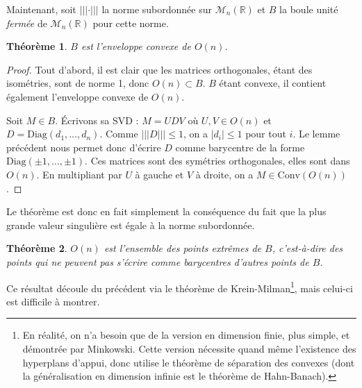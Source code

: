 \documentclass[a4paper, 11pt]{article}
\def\R{\mathbb{R}}
\def\M{\mathcal{M}}
\def\Diag{\mathrm{Diag}}
\newtheorem*{theorem}{Théorème}
\begin{document}
Maintenant, soit $||| \cdot |||$ la norme subordonnée sur $\M_n(\R)$ et $B$ la
boule unité \emph{fermée} de $\M_n(\R)$ pour cette norme.

\begin{theorem}
  $B$ est l'enveloppe convexe de $O(n)$. 
\end{theorem}

\begin{proof}
  Tout d'abord, il est clair que les matrices orthogonales, étant des
  isométries, sont de norme 1, donc $O(n) \subset B$. $B$ étant convexe, il
  contient également l'enveloppe convexe de $O(n)$.

  Soit $M \in B$. Écrivons sa SVD : $M = UDV$ où $U, V \in O(n)$ et $D =
  \Diag(d_1, \ldots, d_n)$. Comme $|||D||| \leq 1$, on a $|d_i| \leq 1$ pour
  tout $i$. Le lemme précédent nous permet donc d'écrire $D$ comme barycentre de
  la forme $\Diag(\pm 1, \ldots, \pm 1)$. Ces matrices sont des symétries
  orthogonales, elles sont dans $O(n)$. En multipliant par $U$ à gauche et $V$ à
  droite, on a $M \in \mathrm{Conv}(O(n))$.
\end{proof}

Le théorème est donc en fait simplement la conséquence du fait que la plus
grande valeur singulière est égale à la norme subordonnée.

\begin{theorem}
  $O(n)$ est l'ensemble des \emph{points extrêmes} de $B$, c'est-à-dire des
  points qui ne peuvent pas s'écrire comme barycentres d'autres points de $B$.
\end{theorem}

Ce résultat découle du précédent via le théorème de Krein-Milman\footnote{En
  réalité, on n'a besoin que de la version en dimension finie, plus simple, et
  démontrée par Minkowski. Cette version nécessite quand même l'existence des
  hyperplans d'appui, donc utilise le théorème de séparation des convexes (dont
  la généralisation en dimension infinie est le théorème de Hahn-Banach).}, mais
celui-ci est difficile à montrer.
\end{document}
